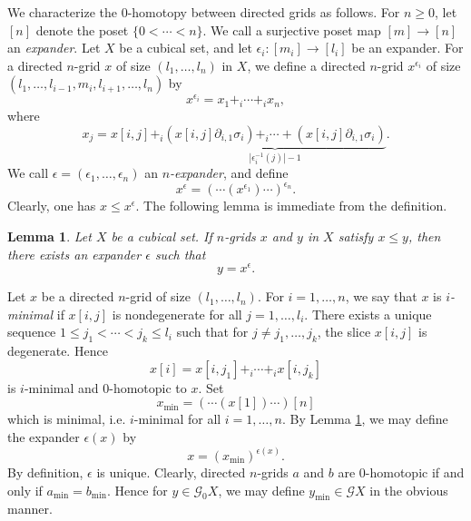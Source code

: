 \documentclass[oneside, 12pt]{amsart}
\numberwithin{equation}{section}
\theoremstyle{plain}
\newtheorem{lemma}[theorem]{Lemma}
\theoremstyle{definition}
\theoremstyle{remark}
\begin{document}
	We characterize the 0-homotopy between directed grids as follows. For $n\ge 0$, let $[n]$ denote the poset $\{0<\cdots<n\}$. We call a surjective poset map $[m]\to[n]$ an \emph{expander}. Let $X$ be a cubical set, and let $\epsilon_i\colon[m_i]\to[l_i]$ be an expander. For a directed $n$-grid $x$ of size $(l_1,\ldots,l_n)$ in $X$, we define a directed $n$-grid $x^{\epsilon_i}$ of size $(l_1,\ldots,l_{i-1},m_i,l_{i+1},\ldots,l_n)$ by
	\[
	x^{\epsilon_i}=x_1+_i\cdots+_ix_n,
	\]
	where
	\[
	x_j=x[i,j]+_i\underbrace{(x[i,j]\partial_{i,1}\sigma_i)+_i\cdots+(x[i,j]\partial_{i,1}\sigma_i)}_{|\epsilon_i^{-1}(j)|-1}.
	\]
	We call $\epsilon=(\epsilon_1,\ldots,\epsilon_n)$ an \emph{$n$-expander}, and define
	\[
	x^\epsilon=(\cdots(x^{\epsilon_1})\cdots)^{\epsilon_n}.
	\]
	Clearly, one has $x\le x^\epsilon$. The following lemma is immediate from the definition.
	
	
	
	\begin{lemma}
		\label{expander}
		Let $X$ be a cubical set. If $n$-grids $x$ and $y$ in $X$ satisfy $x\le y$, then there exists an expander $\epsilon$ such that
		\[
		y=x^\epsilon.
		\]
	\end{lemma}
	
	
	
	Let $x$ be a directed $n$-grid of size $(l_1,\ldots,l_n)$. For $i=1,\ldots,n$, we say that $x$ is \emph{$i$-minimal} if $x[i,j]$ is nondegenerate for all $j=1,\ldots,l_i$. There exists a unique sequence $1\le j_1<\cdots<j_k\le l_i$ such that for $j\ne j_1,\ldots,j_k$, the slice $x[i,j]$ is degenerate. Hence
	\[
	x[i]=x[i,j_1]+_i\cdots+_ix[i,j_k]
	\]
	is $i$-minimal and 0-homotopic to $x$. Set
	\[
	x_{\mathrm{min}}=(\cdots(x[1])\cdots)[n]
	\]
	which is minimal, i.e. $i$-minimal for all $i=1,\ldots,n$. By Lemma \ref{expander}, we may define the expander $\epsilon(x)$ by
	\[
	x=(x_{\mathrm{min}})^{\epsilon(x)}.
	\]
	By definition, $\epsilon$ is unique. Clearly, directed $n$-grids $a$ and $b$ are 0-homotopic if and only if $a_{\mathrm{min}}=b_{\mathrm{min}}$. Hence for $y\in\mathcal{G}_0X$, we may define $y_\mathrm{min}\in\mathcal{G}X$ in the obvious manner.
	
	
	
\end{document}
